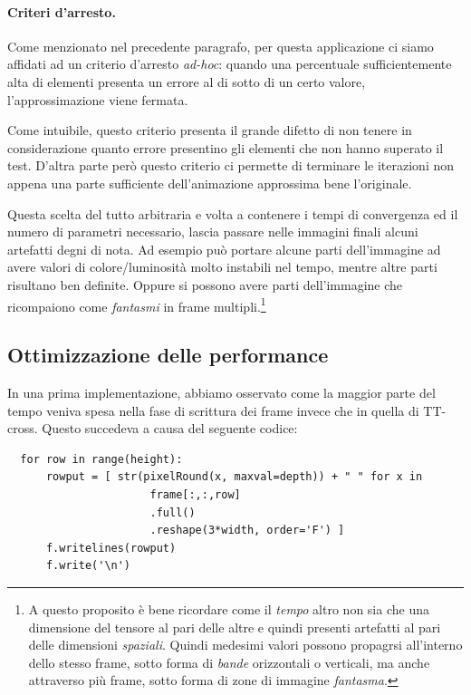 \documentclass[11pt,a4paper]{article}
\begin{document}
\paragraph{Criteri d'arresto.}
Come menzionato nel precedente paragrafo, per questa applicazione ci siamo affidati ad un criterio d'arresto \emph{ad-hoc}: quando una percentuale sufficientemente alta di elementi presenta un errore al di sotto di un certo valore, l'approssimazione viene fermata.

Come intuibile, questo criterio presenta il grande difetto di non tenere in considerazione quanto errore presentino gli elementi che non hanno superato il test.
D'altra parte però questo criterio ci permette di terminare le iterazioni non appena una parte sufficiente dell'animazione approssima bene l'originale.

Questa scelta del tutto arbitraria e volta a contenere i tempi di convergenza ed il numero di parametri necessario, lascia passare nelle immagini finali alcuni artefatti degni di nota. Ad esempio può portare alcune parti dell'immagine ad avere valori di colore/luminosità molto instabili nel tempo, mentre altre parti risultano ben definite. Oppure si possono avere parti dell'immagine che ricompaiono come \emph{fantasmi} in frame multipli.\footnote{A questo proposito è bene ricordare come il \emph{tempo} altro non sia che una dimensione del tensore al pari delle altre e quindi presenti artefatti al pari delle dimensioni \emph{spaziali}. Quindi medesimi valori possono propagrsi all'interno dello stesso frame, sotto forma di \emph{bande} orizzontali o verticali, ma anche attraverso più frame, sotto forma di zone di immagine \emph{fantasma}.}

\newpage

\subsection{Ottimizzazione delle performance}
In una prima implementazione, abbiamo osservato come la maggior parte del tempo veniva spesa nella fase di scrittura dei frame invece che in quella di TT-cross.
Questo succedeva a causa del seguente codice: 

\begin{lstlisting}
  for row in range(height):
      rowput = [ str(pixelRound(x, maxval=depth)) + " " for x in 
                      frame[:,:,row]
                      .full()
                      .reshape(3*width, order='F') ]
      f.writelines(rowput)
      f.write('\n')
\end{lstlisting}
\end{document}
